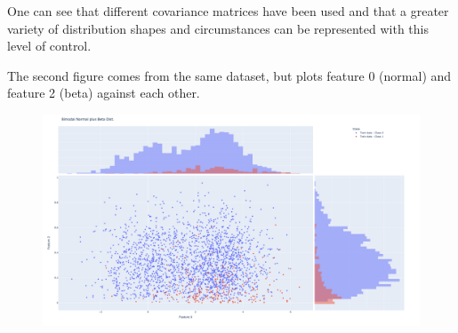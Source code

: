 One can see that different covariance matrices have been used 
and that a greater variety of distribution shapes and circumstances can be represented with this level of control.

The second figure comes from the same dataset, but plots feature 0 (normal) and feature 2 (beta) against each other.

\begin{figure}[H]
  	\centering
  	\includegraphics[width=\linewidth]{assets/data_vis/Normal_Beta.png}
  	\label{fig:Normal plus Beta}
\end{figure}

